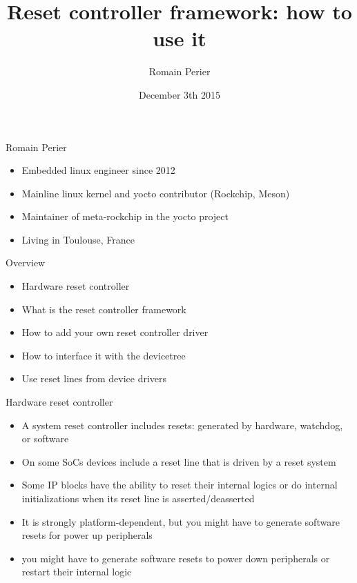 \documentclass{beamer}
\title{Reset controller framework: how to use it}
\author{Romain Perier}
\institute{Embedded linux engineer and foss developer\newline romain.perier@gmail.com}
\date{December 3th 2015}
\begin{document}
\begin{frame}
\titlepage{}
\end{frame}

\begin{frame}{Romain Perier}
	\begin{itemize}
		\item Embedded linux engineer since 2012
		\item Mainline linux kernel and yocto contributor (Rockchip, Meson)
		\item Maintainer of meta-rockchip in the yocto project
		\item Living in Toulouse, France
	\end{itemize}
\end{frame}

\begin{frame}{Overview}
	\begin{itemize}
		\item Hardware reset controller
		\item What is the reset controller framework
		\item How to add your own reset controller driver
		\item How to interface it with the devicetree
		\item Use reset lines from device drivers
	\end{itemize}
\end{frame}

\begin{frame}{Hardware reset controller}
	\begin{itemize}
		\item A system reset controller includes resets: generated by hardware, watchdog, or software
		\item On some SoCs devices include a reset line that is driven by a reset system
		\item Some IP blocks have the ability to reset their internal logics or do internal initializations when its reset line is asserted/deasserted
		\item It is strongly platform-dependent, but you might have to generate software resets for power up peripherals
		\item you might have to generate software resets to power down peripherals or restart their internal logic
	\end{itemize}
\end{frame}
\end{document}
